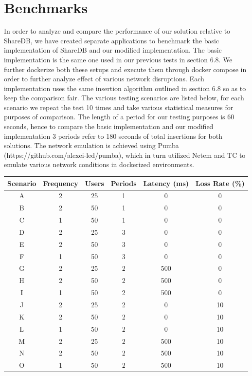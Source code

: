 \documentclass[9pt, titlepage]{article}
\begin{document}
  \section*{Benchmarks}
  In order to analyze and compare the performance of our solution relative to ShareDB, we have created separate applications to benchmark 
  the basic implementation of ShareDB and our modified implementation. The basic implementation is the same one used in our previous tests
  in section 6.8. We further dockerize both these setups and execute them through docker compose in order to further analyze effect of
  various network disruptions. Each implementation uses the same insertion algorithm outlined in section 6.8 so as to keep the comparison 
  fair. The various testing scenarios are listed below, for each scenario we repeat the test 10 times and take various statistical measures
  for purposes of comparison. The length of a period for our testing purposes is 60 seconds, hence to compare the basic implementation and
  our modified implementation 3 periods refer to 180 seconds of total insertions for both solutions. The network emulation is achieved using
  Pumba (https://github.com/alexei-led/pumba), which in turn utilized Netem and TC to emulate various network conditions in 
  dockerized environments.
  \begin{center}
    \centering
    \begin{tabular}{||c c c c c c||} 
      \hline
      Scenario & Frequency & Users & Periods & Latency (ms) & Loss Rate (\%)\\ [0.5ex]
      \hline\hline
      A & 2 & 25 & 1 & 0 & 0\\ 
      \hline
      B & 2 & 50 & 1 & 0 & 0\\
      \hline
      C & 1 & 50 & 1 & 0 & 0\\
      \hline
      D & 2 & 25 & 3 & 0 & 0\\
      \hline
      E & 2 & 50 & 3 & 0 & 0\\
      \hline
      F & 1 & 50 & 3 & 0 & 0\\
      \hline
      G & 2 & 25 & 2 & 500 & 0\\
      \hline
      H & 2 & 50 & 2 & 500 & 0\\
      \hline
      I & 1 & 50 & 2 & 500 & 0\\
      \hline
      J & 2 & 25 & 2 & 0 & 10\\
      \hline
      K & 2 & 50 & 2 & 0 & 10\\
      \hline
      L & 1 & 50 & 2 & 0 & 10\\
      \hline
      M & 2 & 25 & 2 & 500 & 10\\
      \hline
      N & 2 & 50 & 2 & 500 & 10\\
      \hline
      O & 1 & 50 & 2 & 500 & 10\\
      \hline
    \end{tabular}
  \end{center}
\end{document}
